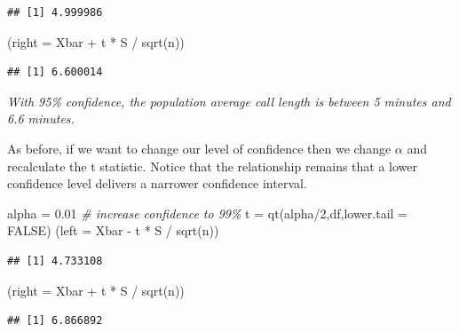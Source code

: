\documentclass[
]{book}
\newenvironment{Shaded}{\begin{snugshade}}{\end{snugshade}}
\newcommand{\AttributeTok}[1]{\textcolor[rgb]{0.77,0.63,0.00}{#1}}
\newcommand{\CommentTok}[1]{\textcolor[rgb]{0.56,0.35,0.01}{\textit{#1}}}
\newcommand{\ConstantTok}[1]{\textcolor[rgb]{0.00,0.00,0.00}{#1}}
\newcommand{\DecValTok}[1]{\textcolor[rgb]{0.00,0.00,0.81}{#1}}
\newcommand{\FloatTok}[1]{\textcolor[rgb]{0.00,0.00,0.81}{#1}}
\newcommand{\FunctionTok}[1]{\textcolor[rgb]{0.00,0.00,0.00}{#1}}
\newcommand{\NormalTok}[1]{#1}
\newcommand{\OtherTok}[1]{\textcolor[rgb]{0.56,0.35,0.01}{#1}}
\newcommand{\SpecialCharTok}[1]{\textcolor[rgb]{0.00,0.00,0.00}{#1}}
\begin{document}
\begin{verbatim}
## [1] 4.999986
\end{verbatim}

\begin{Shaded}
\begin{Highlighting}[]
\NormalTok{(}\AttributeTok{right =}\NormalTok{ Xbar }\SpecialCharTok{+}\NormalTok{ t }\SpecialCharTok{*}\NormalTok{ S }\SpecialCharTok{/} \FunctionTok{sqrt}\NormalTok{(n))}
\end{Highlighting}
\end{Shaded}

\begin{verbatim}
## [1] 6.600014
\end{verbatim}

\emph{With 95\% confidence, the population average call length is between 5 minutes and 6.6 minutes.}

As before, if we want to change our level of confidence then we change \(\alpha\) and recalculate the t statistic. Notice that the relationship remains that a lower confidence level delivers a narrower confidence interval.

\begin{Shaded}
\begin{Highlighting}[]
\NormalTok{alpha }\OtherTok{=} \FloatTok{0.01} \CommentTok{\# increase confidence to 99\%}
\NormalTok{t }\OtherTok{=} \FunctionTok{qt}\NormalTok{(alpha}\SpecialCharTok{/}\DecValTok{2}\NormalTok{,df,}\AttributeTok{lower.tail =} \ConstantTok{FALSE}\NormalTok{)}
\NormalTok{(}\AttributeTok{left =}\NormalTok{ Xbar }\SpecialCharTok{{-}}\NormalTok{ t }\SpecialCharTok{*}\NormalTok{ S }\SpecialCharTok{/} \FunctionTok{sqrt}\NormalTok{(n))}
\end{Highlighting}
\end{Shaded}

\begin{verbatim}
## [1] 4.733108
\end{verbatim}

\begin{Shaded}
\begin{Highlighting}[]
\NormalTok{(}\AttributeTok{right =}\NormalTok{ Xbar }\SpecialCharTok{+}\NormalTok{ t }\SpecialCharTok{*}\NormalTok{ S }\SpecialCharTok{/} \FunctionTok{sqrt}\NormalTok{(n))}
\end{Highlighting}
\end{Shaded}

\begin{verbatim}
## [1] 6.866892
\end{verbatim}
\end{document}

